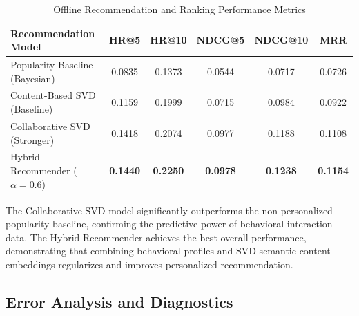 \documentclass[11pt,a4paper]{article}
\begin{document}
\begin{table}[ht]
\centering
\caption{Offline Recommendation and Ranking Performance Metrics}
\label{tab:recommendation_metrics}
\begin{tabular}{lccccc}
\hline
\textbf{Recommendation Model} & \textbf{HR@5} & \textbf{HR@10} & \textbf{NDCG@5} & \textbf{NDCG@10} & \textbf{MRR} \\ \hline
Popularity Baseline (Bayesian) & 0.0835 & 0.1373 & 0.0544 & 0.0717 & 0.0726 \\
Content-Based SVD (Baseline) & 0.1159 & 0.1999 & 0.0715 & 0.0984 & 0.0922 \\
Collaborative SVD (Stronger) & 0.1418 & 0.2074 & 0.0977 & 0.1188 & 0.1108 \\
Hybrid Recommender ($\alpha=0.6$) & \textbf{0.1440} & \textbf{0.2250} & \textbf{0.0978} & \textbf{0.1238} & \textbf{0.1154} \\ \hline
\end{tabular}
\end{table}

The Collaborative SVD model significantly outperforms the non-personalized popularity baseline, confirming the predictive power of behavioral interaction data. The Hybrid Recommender achieves the best overall performance, demonstrating that combining behavioral profiles and SVD semantic content embeddings regularizes and improves personalized recommendation.

\subsection{Error Analysis and Diagnostics}
\end{document}
